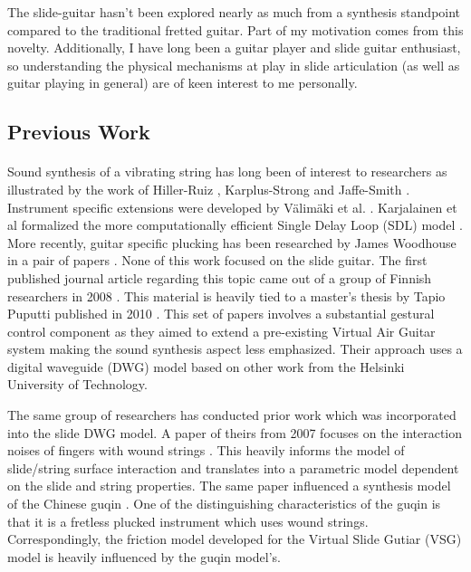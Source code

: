 \documentclass[12pt]{article}
\begin{document}
The slide-guitar hasn’t been explored nearly as much from a synthesis standpoint compared to the traditional fretted guitar. Part of my motivation comes from this novelty. Additionally, I have long been a guitar player and slide guitar enthusiast, so understanding the physical mechanisms at play in slide articulation (as well as guitar playing in general) are of keen interest to me personally.

\subsection*{Previous Work}
\paragraph{}
Sound synthesis of a vibrating string has long been of interest to researchers as illustrated by the work of Hiller-Ruiz \cite{hiller_synthesizing_1971} \cite{hiller_synthesizing_1971-1}, Karplus-Strong \cite{karplus_digital_1983} and Jaffe-Smith \cite{jaffe_extensions_1983}. Instrument specific extensions were developed by Välimäki et al. \cite{vaelimaeki_physical_1996}.  Karjalainen et al formalized the more computationally efficient Single Delay Loop (SDL) model \cite{karjalainen_plucked-string_1998}. More recently, guitar specific plucking has been researched by James Woodhouse in a pair of papers \cite{woodhouse_synthesis_2004} \cite{woodhouse_plucked_2004}. None of this work focused on the slide guitar. The first published journal article regarding this topic came out of a group of Finnish researchers in 2008 \cite{pakarinen_virtual_2008}. This material is heavily tied to a master’s thesis by Tapio Puputti published in 2010 \cite{puputti_real-time_2012}. This set of papers involves a substantial gestural control component as they aimed to extend a pre-existing Virtual Air Guitar system making the sound synthesis aspect less emphasized. Their approach uses a digital waveguide (DWG) model based on other work from the Helsinki University of Technology.

The same group of researchers has conducted prior work which was incorporated into the slide DWG model. A paper of theirs from 2007 focuses on the interaction noises of fingers with wound strings \cite{pakarinen_analysis_2007}. This heavily informs the model of slide/string surface interaction and translates into a parametric model dependent on the slide and string properties. The same paper influenced a synthesis model of the Chinese guqin \cite{penttinen_model-based_2006}. One of the distinguishing characteristics of the guqin is that it is a fretless plucked instrument which uses wound strings. Correspondingly, the friction model developed for the Virtual Slide Gutiar (VSG) model is heavily influenced by the guqin model's.
\end{document}
